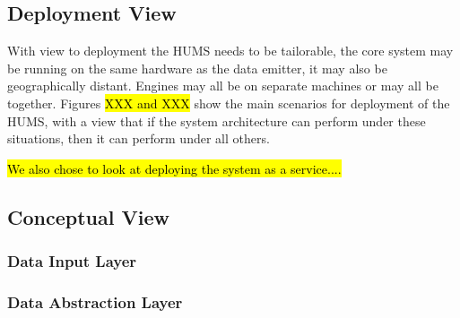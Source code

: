 \documentclass[10pt,a4paper]{article}
\begin{document}
\subsection{Deployment View}
With view to deployment the HUMS needs to be tailorable, the core system may be running on the same hardware as the data emitter, it may also be geographically distant. Engines may all be on separate machines or may all be together. Figures \hl{XXX and XXX} show the main scenarios for deployment of the HUMS, with a view that if the system architecture can perform under these situations, then it can perform under all others.

\hl{We also chose to look at deploying the system as a service....}

\subsection{Conceptual View}
\subsubsection{Data Input Layer}
\subsubsection{Data Abstraction Layer}
\end{document}
